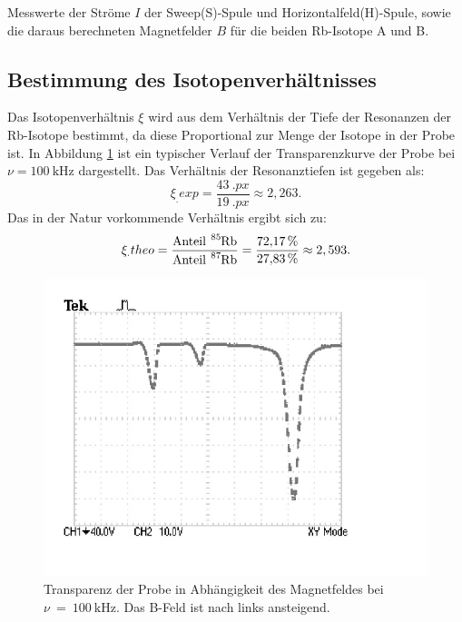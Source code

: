 \begin{table}
	\centering
	\caption{Messwerte der Ströme $I$ der Sweep(S)-Spule und Horizontalfeld(H)-Spule, sowie die daraus berechneten Magnetfelder $B$ für die beiden Rb-Isotope A und B.}
	
	
	\label{tab:messung1}
\end{table}

\subsection{Bestimmung des Isotopenverhältnisses}

Das Isotopenverhältnis $\xi$ wird aus dem Verhältnis der Tiefe der Resonanzen der Rb-Isotope bestimmt, da diese Proportional zur Menge der Isotope in der Probe ist. In Abbildung \ref{fig:typisch} ist ein typischer Verlauf der Transparenzkurve der Probe bei $\nu=\SI{100}{\kilo\hertz}$ dargestellt.
Das Verhältnis der Resonanztiefen ist gegeben als:
\[
\xi_.{exp} = \frac{\SI{43}{.{px}}}{\SI{19}{.{px}}} \approx 2,263 \text{.}
\]
Das in der Natur vorkommende Verhältnis ergibt sich zu:
\[
\xi_.{theo} = \frac{\text{Anteil}~ \ce{^{85}Rb}}{\text{Anteil}~ \ce{^{87}Rb}}=\frac{\SI{72,17}{\%}}{\SI{27,83}{\%}} \approx 2,593 \text{.}
\]
\begin{figure}
	\centering
	\includegraphics[width=\linewidth-60pt,height=\textheight-60pt,keepaspectratio]{content/images/TEK0006.pdf}
	\caption{Transparenz der Probe in Abhängigkeit des Magnetfeldes bei $\nu~=~\SI{100}{\kilo\hertz}$. Das B-Feld ist nach links ansteigend.}
	\label{fig:typisch}
\end{figure}

